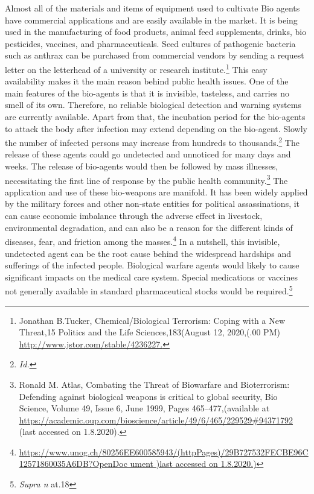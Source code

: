 \begin{multicols}{2}

\noi
Almost all of the materials and items of equipment used to cultivate Bio agents have
commercial applications and are easily available in the market. It is being used in the
manufacturing of food products, animal feed supplements, drinks, bio pesticides, vaccines,
and pharmaceuticals. Seed cultures of pathogenic bacteria such as anthrax can be purchased
from commercial vendors by sending a request letter on the letterhead of a university or
research institute.\footnote{Jonathan B.Tucker, Chemical/Biological Terrorism: Coping with a New Threat,15 Politics and the Life Sciences,183(August 12, 2020,(.00 PM) \url{http://www.jstor.com/stable/4236227.}} This easy availability makes it the main reason behind public health
issues. One of the main features of the bio-agents is that it is invisible, tasteless, and carries
no smell of its own. Therefore, no reliable biological detection and warning systems are
currently available. Apart from that, the incubation period for the bio-agents to attack the
body after infection may extend depending on the bio-agent. Slowly the number of infected
persons may increase from hundreds to thousands.\footnote{\textit{Id.}} The release of these agents could go
undetected and unnoticed for many days and weeks. The release of bio-agents would then be
followed by mass illnesses, necessitating the first line of response by the public health
community.\footnote{Ronald M. Atlas, Combating the Threat of Biowarfare and Bioterrorism: Defending against biological weapons is critical to global security, Bio Science, Volume 49, Issue 6, June 1999, Pages 465–477,(available at \url{https://academic.oup.com/bioscience/article/49/6/465/229529#94371792} (last accessed on 1.8.2020). }  The application and use of these bio-weapons are manifold. It has been widely
applied by the military forces and other non-state entities for political assassinations, it can
cause economic imbalance through the adverse effect in livestock, environmental degradation, and can also be a reason for the different kinds of diseases, fear, and friction
among the masses.\footnote{\url{https://www.unog.ch/80256EE600585943/(httpPages)/29B727532FECBE96C12571860035A6DB?OpenDoc
ument )last accessed on 1.8.2020.)}} In a nutshell, this invisible, undetected agent can be the root cause
behind the widespread hardships and sufferings of the infected people. Biological warfare
agents would likely to cause significant impacts on the medical care system. Special
medications or vaccines not generally available in standard pharmaceutical stocks would be
required.\footnote{\textit{Supra n} at.18}


\end{multicols}
